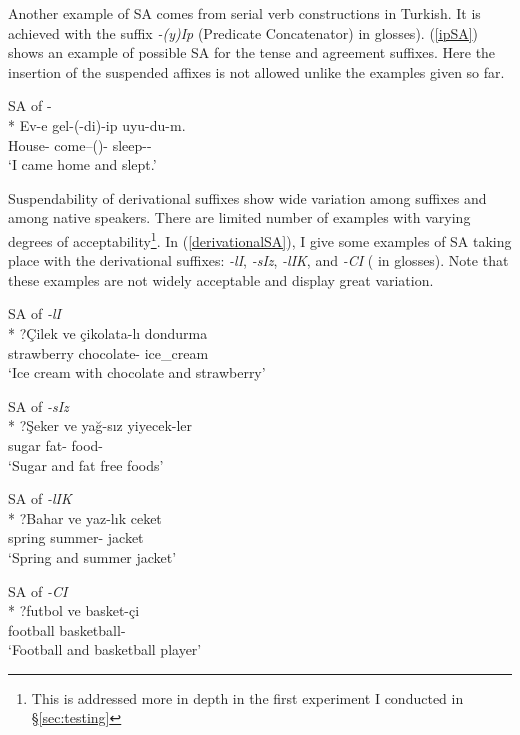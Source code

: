 Another example of SA comes from serial verb constructions in Turkish. It is achieved with the suffix \textit{-(y)Ip} (Predicate Concatenator) {\Pc} in glosses). (\ref{ipSA}) shows an example of possible SA for the tense and agreement suffixes. Here the insertion of the suspended affixes is not allowed unlike the examples given so far.

\begin{exe}
    \ex \label{ipSA} SA of {\Pst-\Fsg}\\*
    \gll Ev-e gel-(-di)-ip uyu-du-m. \\ 
    House-{\Dat} come--({\Pst})-{\Pc} sleep-{{\Pst}}-{\Fsg} \\
    \glt `I came home and slept.'
\end{exe}

Suspendability of derivational suffixes show wide variation among suffixes and among native speakers. There are limited number of examples with varying degrees of acceptability\footnote{This is addressed more in depth in the first experiment I conducted in \S\ref{sec:testing}}. In (\ref{derivationalSA}), I give some examples of SA taking place with the derivational suffixes: \textit{-lI}, \textit{-sIz}, \textit{-lIK}, and \textit{-CI} ({\Der} in glosses). Note that these examples are not widely acceptable and display great variation.

\begin{exe}
    \ex \label{derivationalSA}
    \begin{xlist}
        \ex SA of \textit{-lI}\\*
        \gll ?Çilek ve çikolata-lı dondurma \\ 
        strawberry {\And} chocolate-{\Der} ice\_cream \\
        \glt `Ice cream with chocolate and strawberry'
        
        \ex SA of \textit{-sIz}\\*
        \gll ?Şeker ve yağ-sız yiyecek-ler \\ 
        sugar {\And} fat-{\Der} food-{\Pl} \\
        \glt `Sugar and fat free foods'
        
        \ex SA of \textit{-lIK}\\*
        \gll ?Bahar ve yaz-lık ceket \\ 
        spring {\And} summer-{\Der} jacket \\
        \glt `Spring and summer jacket'
        
        \ex SA of \textit{-CI}\\*
        \gll ?futbol ve basket-çi \\ 
        football {\And} basketball-{\Der} \\ 
        \glt `Football and basketball player'
    \end{xlist}
\end{exe}
